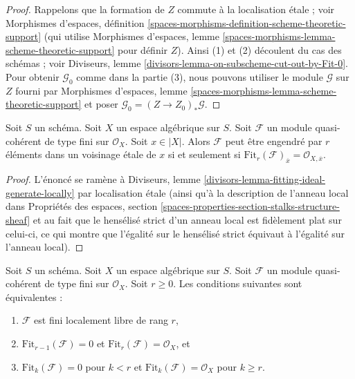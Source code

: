 \begin{proof}
Rappelons que la formation de $Z$ commute à la localisation \'etale ; voir
Morphismes d'espaces, définition
\ref{spaces-morphisms-definition-scheme-theoretic-support}
(qui utilise Morphismes d'espaces, lemme
\ref{spaces-morphisms-lemma-scheme-theoretic-support}
pour définir $Z$). Ainsi (1) et (2) découlent du cas des schémas ; voir
Diviseurs, lemme \ref{divisors-lemma-on-subscheme-cut-out-by-Fit-0}.
Pour obtenir $\mathcal{G}_0$ comme dans la partie (3), nous pouvons utiliser
le module $\mathcal{G}$ sur $Z$ fourni par Morphismes d'espaces, lemme
\ref{spaces-morphisms-lemma-scheme-theoretic-support}
et poser $\mathcal{G}_0 = (Z \to Z_0)_*\mathcal{G}$.
\end{proof}

\begin{lemma}
\label{lemma-fitting-ideal-generate-locally}
Soit $S$ un schéma. Soit $X$ un espace algébrique sur $S$.
Soit $\mathcal{F}$ un module quasi-cohérent de type fini
sur $\mathcal{O}_X$. Soit $x \in |X|$. Alors $\mathcal{F}$ peut être
engendré par $r$ éléments dans un voisinage \'etale de $x$ si et seulement
si $\text{Fit}_r(\mathcal{F})_{\overline{x}} = \mathcal{O}_{X, \overline{x}}$.
\end{lemma}

\begin{proof}
L'énoncé se ramène à
Diviseurs, lemme \ref{divisors-lemma-fitting-ideal-generate-locally}
par localisation \'etale (ainsi qu'à la description de l'anneau
local dans Propriétés des espaces, section
\ref{spaces-properties-section-stalks-structure-sheaf}
et au fait que le hensélisé strict d'un anneau local
est fidèlement plat sur celui-ci, ce qui montre que l'égalité sur le hensélisé
strict équivaut à l'égalité sur l'anneau local).
\end{proof}

\begin{lemma}
\label{lemma-fitting-ideal-finite-locally-free}
Soit $S$ un schéma. Soit $X$ un espace algébrique sur $S$.
Soit $\mathcal{F}$ un module quasi-cohérent de type fini
sur $\mathcal{O}_X$. Soit $r \geq 0$. Les conditions suivantes sont équivalentes :
\begin{enumerate}
\item $\mathcal{F}$ est fini localement libre de rang $r$,
\item $\text{Fit}_{r - 1}(\mathcal{F}) = 0$ et
$\text{Fit}_r(\mathcal{F}) = \mathcal{O}_X$, et
\item $\text{Fit}_k(\mathcal{F}) = 0$ pour $k < r$ et
$\text{Fit}_k(\mathcal{F}) = \mathcal{O}_X$ pour $k \geq r$.
\end{enumerate}
\end{lemma}

